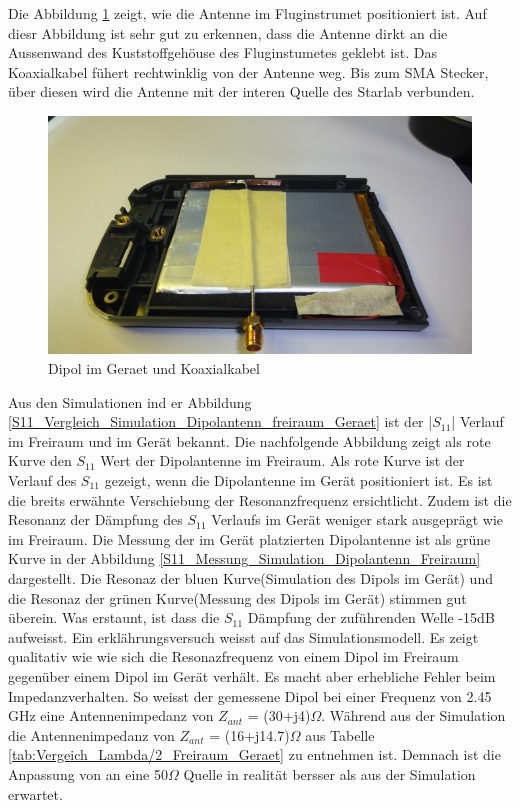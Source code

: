 \newpage
Die Abbildung \ref{fig:DipolimGeraet} zeigt, wie die Antenne im Fluginstrumet positioniert ist. Auf diesr Abbildung ist sehr gut zu erkennen, dass die Antenne dirkt an die Aussenwand des Kuststoffgehöuse des Fluginstumetes geklebt ist. Das Koaxialkabel fühert rechtwinklig von der Antenne weg. Bis zum SMA Stecker, über diesen wird die Antenne mit der interen Quelle des Starlab verbunden.\\
\begin{figure}[!ht]
	\centering
	\includegraphics[width=13cm]{content/bilder/Implementierung/DipolKabelGeraet.jpg}%
	\caption{Dipol im Geraet und Koaxialkabel}
	\label{fig:DipolimGeraet}
\end{figure}

\newpage
Aus den Simulationen ind er Abbildung \ref{S11_Vergleich_Simulation_Dipolantenn_freiraum_Geraet} ist der |$S_{11}$| Verlauf im Freiraum und im Gerät bekannt. Die nachfolgende Abbildung zeigt als rote Kurve den $S_{11}$ Wert der Dipolantenne im Freiraum. Als rote Kurve ist der Verlauf des $S_{11}$ gezeigt, wenn die Dipolantenne im Gerät positioniert ist. Es ist die breits erwähnte Verschiebung der Resonanzfrequenz ersichtlicht. Zudem ist die Resonanz der Dämpfung des $S_{11}$ Verlaufs im Gerät weniger stark ausgeprägt wie im Freiraum. Die Messung der im Gerät platzierten Dipolantenne ist als grüne Kurve in der Abbildung \ref{S11_Messung_Simulation_Dipolantenn_Freiraum} dargestellt. Die Resonaz der bluen Kurve(Simulation des Dipols im Gerät) und die Resonaz der grünen Kurve(Messung des Dipols im Gerät) stimmen gut überein. Was erstaunt, ist dass die $S_{11}$ Dämpfung der zuführenden Welle -15dB aufweisst. Ein erklährungsversuch weisst auf das Simulationsmodell. Es zeigt qualitativ wie wie sich die Resonazfrequenz von einem Dipol im Freiraum gegenüber einem Dipol im Gerät verhält. Es macht aber erhebliche Fehler beim Impedanzverhalten. So weisst der gemessene Dipol bei einer Frequenz von 2.45 GHz eine Antennenimpedanz von $Z_{ant}$ = (30+j4)$\Omega$. Während aus der Simulation die Antennenimpedanz von $Z_{ant}$ = (16+j14.7)$\Omega$ aus Tabelle \ref{tab:Vergeich_Lambda/2_Freiraum_Geraet} zu entnehmen ist. Demnach ist die Anpassung von an eine 50$\Omega$ Quelle in realität bersser als aus der Simulation erwartet.


